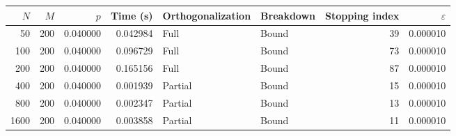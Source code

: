 \begin{tabular}{rrrrllrr}
\toprule
$N$ & $M$ & $p$ & Time (s)& Orthogonalization & Breakdown & Stopping index & $\varepsilon$ \\
\midrule
50 & 200 & 0.040000 & 0.042984 & Full & Bound & 39 & 0.000010 \\
100 & 200 & 0.040000 & 0.096729 & Full & Bound & 73 & 0.000010 \\
200 & 200 & 0.040000 & 0.165156 & Full & Bound & 87 & 0.000010 \\
400 & 200 & 0.040000 & 0.001939 & Partial & Bound & 15 & 0.000010 \\
800 & 200 & 0.040000 & 0.002347 & Partial & Bound & 13 & 0.000010 \\
1600 & 200 & 0.040000 & 0.003858 & Partial & Bound & 11 & 0.000010 \\
\bottomrule
\end{tabular}
